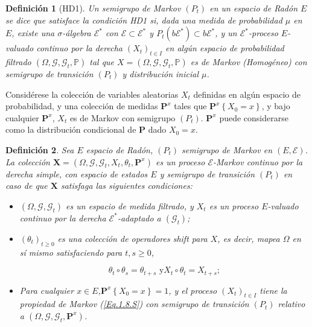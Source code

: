 \documentclass{article}
\newtheorem{Def}{Definición}
\newcommand{\prob}{\mathbb{P}}
\newcommand{\ER}{\left(E,\mathcal{E}\right)}
\newcommand{\PE}{\left(X_{t}\right)_{t\in I}}
\newcommand{\SG}{\left(P_{t}\right)}
\newcommand{\CM}{\mathbf{P}^{x}}
\begin{document}
\begin{Def}[HD1]\label{Eq.2.1.S}
Un semigrupo de Markov $\left(P_{t}\right)$ en un espacio de
Rad\'on $E$ se dice que satisface la condici\'on {\em HD1} si,
dada una medida de probabilidad $\mu$ en $E$, existe una
$\sigma$-\'algebra $\mathcal{E^{*}}$ con
$\mathcal{E}\subset\mathcal{E}^{*}$ y
$P_{t}\left(b\mathcal{E}^{*}\right)\subset b\mathcal{E}^{*}$, y un
$\mathcal{E}^{*}$-proceso $E$-valuado continuo por la derecha
$\PE$ en alg\'un espacio de probabilidad filtrado
$\left(\Omega,\mathcal{G},\mathcal{G}_{t},\prob\right)$ tal que
$X=\left(\Omega,\mathcal{G},\mathcal{G}_{t},\prob\right)$ es de
Markov (Homog\'eneo) con semigrupo de transici\'on $(P_{t})$ y
distribuci\'on inicial $\mu$.
\end{Def}

Consid\'erese la colecci\'on de variables aleatorias $X_{t}$
definidas en alg\'un espacio de probabilidad, y una colecci\'on de
medidas $\mathbf{P}^{x}$ tales que
$\mathbf{P}^{x}\left\{X_{0}=x\right\}$, y bajo cualquier
$\mathbf{P}^{x}$, $X_{t}$ es de Markov con semigrupo
$\left(P_{t}\right)$. $\mathbf{P}^{x}$ puede considerarse como la
distribuci\'on condicional de $\mathbf{P}$ dado $X_{0}=x$.

\begin{Def}\label{Def.2.2.S}
Sea $E$ espacio de Rad\'on, $\SG$ semigrupo de Markov en $\ER$. La
colecci\'on
$\mathbf{X}=\left(\Omega,\mathcal{G},\mathcal{G}_{t},X_{t},\theta_{t},\CM\right)$
es un proceso $\mathcal{E}$-Markov continuo por la derecha simple,
con espacio de estados $E$ y semigrupo de transici\'on $\SG$ en
caso de que $\mathbf{X}$ satisfaga las siguientes condiciones:
\begin{itemize}
\item[i)] $\left(\Omega,\mathcal{G},\mathcal{G}_{t}\right)$ es un
espacio de medida filtrado, y $X_{t}$ es un proceso $E$-valuado
continuo por la derecha $\mathcal{E}^{*}$-adaptado a
$\left(\mathcal{G}_{t}\right)$;

\item[ii)] $\left(\theta_{t}\right)_{t\geq0}$ es una colecci\'on
de operadores {\em shift} para $X$, es decir, mapea $\Omega$ en
s\'i mismo satisfaciendo para $t,s\geq0$,

\begin{equation}\label{Eq.Shift}
\theta_{t}\circ\theta_{s}=\theta_{t+s}\textrm{ y
}X_{t}\circ\theta_{t}=X_{t+s};
\end{equation}

\item[iii)] Para cualquier $x\in E$,$\CM\left\{X_{0}=x\right\}=1$,
y el proceso $\PE$ tiene la propiedad de Markov (\ref{Eq.1.8.S})
con semigrupo de transici\'on $\SG$ relativo a
$\left(\Omega,\mathcal{G},\mathcal{G}_{t},\CM\right)$.
\end{itemize}
\end{Def}
\end{document}
